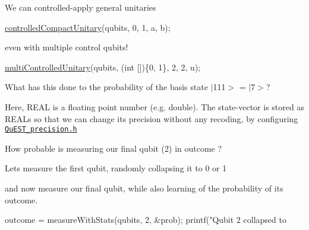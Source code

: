 We can controlled-\/apply general unitaries 
\begin{DoxyCode}
\mbox{\hyperlink{QuEST__env__local_8c_ab4812953bc457405b3aa05a4c2f64f4a}{controlledCompactUnitary}}(qubits, 0, 1, a, b);
\end{DoxyCode}
 even with multiple control qubits! 
\begin{DoxyCode}
\mbox{\hyperlink{QuEST__env__local_8c_ae395a79690283ed81106afadd7a8cd8a}{multiControlledUnitary}}(qubits, (\textcolor{keywordtype}{int} [])\{0, 1\}, 2, 2, u);
\end{DoxyCode}


What has this done to the probability of the basis state $\vert$111$>$ = $\vert$7$>$? 
 Here, {\ttfamily R\+E\+AL} is a floating point number (e.\+g. {\ttfamily double}). The state-\/vector is stored as {\ttfamily R\+E\+AL}s so that we can change its precision without any recoding, by configuring \href{../QuEST/QuEST_precision.h}{\tt Qu\+E\+S\+T\+\_\+precision.\+h}

How probable is measuring our final qubit (2) in outcome {}? 


Let\textquotesingle{}s measure the first qubit, randomly collapsing it to 0 or 1 
 and now measure our final qubit, while also learning of the probability of its outcome. 
\begin{DoxyCode}
outcome = measureWithStats(qubits, 2, &prob);
printf("Qubit 2 collapsed to %
\end{DoxyCode}


